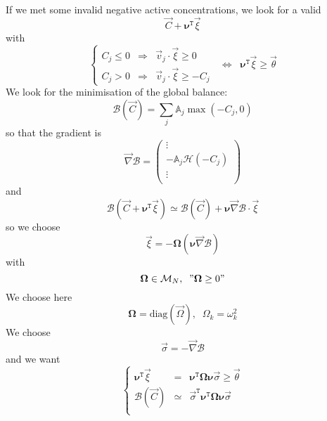 \documentclass[aps,12pt]{revtex4}
\newcommand{\trn}[1]{{#1}^{\mathtt{T}}}
\begin{document}
If we met some invalid negative active concentrations, we look for a valid
\begin{equation}
	\vec{C} + \trn{\bm{\nu}} \vec{\xi}
\end{equation}
with
\begin{equation}
\left\lbrace
\begin{array}{rcl}
	C_j \leq 0 & \Rightarrow & \vec{v}_j \cdot \vec{\xi} \geq 0\\
	C_j > 0    & \Rightarrow & \vec{v}_j \cdot \vec{\xi} \geq -C_j
\end{array}
\right.
\;\;
\Leftrightarrow \;\; \trn{\bm{\nu}} \vec{\xi} \geq \vec{\theta}
\end{equation}
We look for the minimisation  of the global balance:
\begin{equation}
	\mathcal{B}(\vec{C}) = \sum_j \mathbb{A}_j \max(-C_j,0)
\end{equation}
so that the gradient is
\begin{equation}
	\vec{\nabla} \mathcal{B} = 
	\begin{pmatrix}
	\vdots\\
	- \mathbb{A}_j \mathcal{H}(-C_j)\\
	\vdots\\
	\end{pmatrix}
\end{equation}
and
\begin{equation}
	\mathcal{B}(\vec{C} + \trn{\bm{\nu}} \vec{\xi}) \simeq \mathcal{B}(\vec{C}) + \bm{\nu} \vec{\nabla} \mathcal{B} \cdot \vec{\xi}
\end{equation}
so we choose
\begin{equation}
	\vec{\xi} = -\bm{\Omega} (\bm{\nu} \vec{\nabla} \mathcal{B} )
\end{equation}
with
\begin{equation}
	\bm{\Omega} \in \mathcal{M}_N,\;\; "\bm{\Omega}\geq0"
\end{equation}
We choose here
\begin{equation}
	\bm{\Omega} = \mathrm{diag}\left(\vec{\Omega}\right),\;\;\Omega_k = \omega_k^2
\end{equation}
We choose
\begin{equation}
	\vec{\sigma}= -\vec{\nabla} \mathcal{B}
\end{equation}
and we want
\begin{equation}
\left\lbrace
\begin{array}{rcl}
	\trn{\bm{\nu}}\vec{\xi} & = & \trn{\bm{\nu}} \bm{\Omega} \bm{\nu} \vec{\sigma} \geq \vec{\theta}\\
 	\mathcal{B}(\vec{C}) & \simeq & \trn{\vec{\sigma}} \trn{\bm{\nu}} \bm{\Omega} \bm{\nu} \vec{\sigma} \\
\end{array}
\right.
\end{equation}
\end{document}

